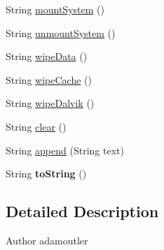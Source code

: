 \begin{DoxyCompactItemize}
\item 
String \hyperlink{class_c_a_s_u_a_l_1_1communicationstools_1_1adb_1_1twrprecovery_1_1_open_recovery_script_a2641b62172dc1476e7c8aad6affa49e9}{mount\-System} ()
\item 
String \hyperlink{class_c_a_s_u_a_l_1_1communicationstools_1_1adb_1_1twrprecovery_1_1_open_recovery_script_aab99289e51efe09025f1b466338f2168}{unmount\-System} ()
\item 
String \hyperlink{class_c_a_s_u_a_l_1_1communicationstools_1_1adb_1_1twrprecovery_1_1_open_recovery_script_abb5c9a8736ebfc0db21b8260e58f1cc1}{wipe\-Data} ()
\item 
String \hyperlink{class_c_a_s_u_a_l_1_1communicationstools_1_1adb_1_1twrprecovery_1_1_open_recovery_script_a4ef2c2c36ae48150cf1aa98d754655c4}{wipe\-Cache} ()
\item 
String \hyperlink{class_c_a_s_u_a_l_1_1communicationstools_1_1adb_1_1twrprecovery_1_1_open_recovery_script_a1eaa63b4ab5c759259621a6b33bec516}{wipe\-Dalvik} ()
\item 
String \hyperlink{class_c_a_s_u_a_l_1_1communicationstools_1_1adb_1_1twrprecovery_1_1_open_recovery_script_aec8050d5b495a16e46b23b0f5b373430}{clear} ()
\item 
String \hyperlink{class_c_a_s_u_a_l_1_1communicationstools_1_1adb_1_1twrprecovery_1_1_open_recovery_script_ac10870b38bae9e8aa7df32596a94da3f}{append} (String text)
\item 
\hypertarget{class_c_a_s_u_a_l_1_1communicationstools_1_1adb_1_1twrprecovery_1_1_open_recovery_script_a4cb0b0f74fd221bd39e4aac87ab69aa5}{String {\bfseries to\-String} ()}\label{class_c_a_s_u_a_l_1_1communicationstools_1_1adb_1_1twrprecovery_1_1_open_recovery_script_a4cb0b0f74fd221bd39e4aac87ab69aa5}

\end{DoxyCompactItemize}


\subsection{Detailed Description}
\begin{DoxyAuthor}{Author}
adamoutler 
\end{DoxyAuthor}


